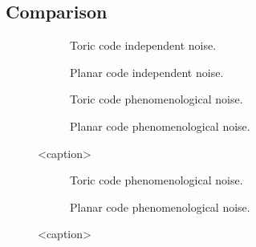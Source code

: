 \subsection{Comparison}\label{ap:figufcomp}
\begin{figure}[htbp]
  \centering
  \begin{subfigure}[b]{0.49\textwidth}
      \begin{adjustbox}{Clip=0 1em 0 0}
        
      \end{adjustbox}
      \caption{Toric code independent noise.}
  \end{subfigure}
  \begin{subfigure}[b]{0.49\textwidth}
      \begin{adjustbox}{Clip=0 1em 0 0}
        
      \end{adjustbox}
      \caption{Planar code independent noise.}
  \end{subfigure}
  \begin{subfigure}[b]{0.49\textwidth}
      \begin{adjustbox}{Clip=0 1em 0 0}
        
      \end{adjustbox}
      \caption{Toric code phenomenological noise.}
  \end{subfigure}
  \begin{subfigure}[b]{0.49\textwidth}
      \begin{adjustbox}{Clip=0 1em 0 0}
        
      \end{adjustbox}
      \caption{Planar code phenomenological noise.}
  \end{subfigure}
  \caption{<caption>}
  \label{fig:mwcomp_uf}
\end{figure}

\begin{figure}[htbp]
  \centering
  \begin{subfigure}[b]{0.49\textwidth}
    \begin{adjustbox}{Clip=0 1em 0 0}
      
    \end{adjustbox}
    \caption{Toric code phenomenological noise.}
  \end{subfigure}
  \begin{subfigure}[b]{0.49\textwidth}
    \begin{adjustbox}{Clip=0 1em 0 0}
      
    \end{adjustbox}
    \caption{Planar code phenomenological noise.}
  \end{subfigure}
  \caption{<caption>}
  \label{fig:tcomp_uf_3d}
\end{figure}


